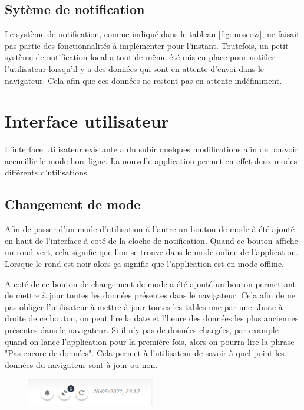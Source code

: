 \documentclass{EPL-master-thesis-covers-FR}
\begin{document}
			\subsection{Sytème de notification}
				Le système de notification, comme indiqué dans le tableau \ref{fig:moscow}, ne faisait pas partie des fonctionnalités à implémenter pour l'instant. Toutefois, un petit système de notification local a tout de même été mis en place pour notifier l'utilisateur lorsqu'il y a des données qui sont en attente d'envoi dans le navigateur. Cela afin que ces données ne restent pas en attente indéfiniment.
		
		
		\section{Interface utilisateur}
			L'interface utilisateur existante a du subir quelques modifications afin de pouvoir accueillir le mode hors-ligne. La nouvelle application permet en effet deux modes différents d'utilisations.
			
			\subsection{Changement de mode}
				Afin de passer d'un mode d'utilisation à l'autre un bouton de mode à été ajouté en haut de l'interface à coté de la cloche de notification. Quand ce bouton affiche un rond vert, cela signifie que l'on se trouve dans le mode online de l'application. Lorsque le rond est noir alors ça signifie que l'application est en mode offline.
				
				 A coté de ce bouton de changement de mode a été ajouté un bouton permettant de mettre à jour toutes les données présentes dans le navigateur. Cela afin de ne pas obliger l'utilisateur à mettre à jour toutes les tables une par une. Juste à droite de ce bouton, on peut lire la date et l'heure des données les plus anciennes présentes dans le navigateur. Si il n'y pas de données chargées, par example quand on lance l'application pour la première fois, alors on pourra lire la phrase "Pas encore de données". Cela permet à l'utilisateur de savoir à quel point les données du navigateur sont à jour ou non.
				
				\begin{figure}[H]
					\centering
					\includegraphics[width=0.5\textwidth]{images/buttons}
					\label{fig:buttons}
				\end{figure}
			
\end{document}
